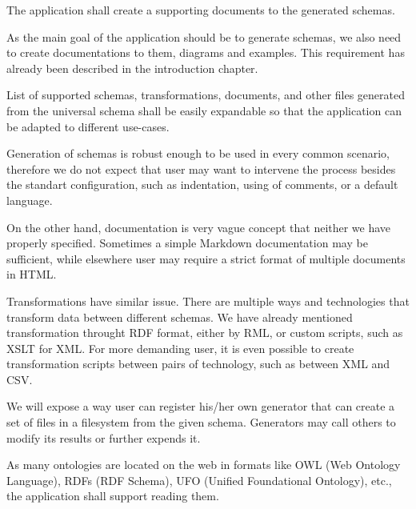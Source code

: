 
\begin{requirement}
    The application shall create a supporting documents to the generated schemas.
\end{requirement}

As the main goal of the application should be to generate schemas, we also need to create documentations to them, diagrams and examples. This requirement has already been described in the introduction chapter. %


\begin{requirement}
    List of supported schemas, transformations, documents, and other files generated from the universal schema shall be easily expandable so that the application can be adapted to different use-cases.
\end{requirement}

Generation of schemas is robust enough to be used in every common scenario, therefore we do not expect that user may want to intervene the process besides the standart configuration, such as indentation, using of comments, or a default language.

On the other hand, documentation is very vague concept that neither we have properly specified. Sometimes a simple Markdown documentation may be sufficient, while elsewhere user may require a strict format of multiple documents in HTML.

Transformations have similar issue. There are multiple ways and technologies that transform data between different schemas. We have already mentioned transformation throught RDF format, either by RML, or custom scripts, such as XSLT for XML. For more demanding user, it is even possible to create transformation scripts between pairs of technology, such as between XML and CSV.

We will expose a way user can register his/her own generator that can create a set of files in a filesystem from the given schema. Generators may call others to modify its results or further expends it.


\begin{requirement}
    \label{requirement:ontologies-on-the-web}
    As many ontologies are located on the web in formats like OWL (Web Ontology Language), RDFs (RDF Schema), UFO (Unified Foundational Ontology), etc., the application shall support reading them.
\end{requirement}

